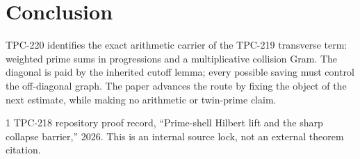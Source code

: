 \documentclass[11pt]{article}
\begin{document}
\section{Conclusion}

TPC-220 identifies the exact arithmetic carrier of the TPC-219 transverse term: weighted
prime sums in progressions and a multiplicative collision Gram. The diagonal is paid by
the inherited cutoff lemma; every possible saving must control the off-diagonal graph.
The paper advances the route by fixing the object of the next estimate, while making no
arithmetic or twin-prime claim.


\begin{thebibliography}{1}
TPC-218 repository proof record, ``Prime-shell Hilbert lift and the sharp collapse barrier,''
2026.  This is an internal source lock, not an external theorem citation.
\end{thebibliography}
\end{document}
